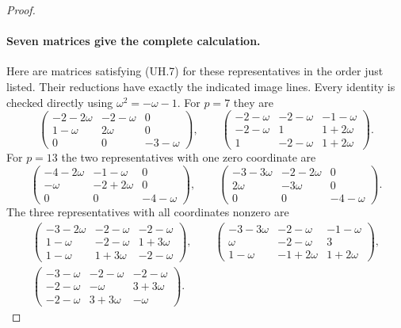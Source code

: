 \begin{proof}
\paragraph{Seven matrices give the complete calculation.}
Here are matrices satisfying (UH.7) for these representatives in the
order just listed.  Their reductions have exactly the indicated image
lines.  Every identity is checked directly using $\omega^2=-\omega-1$.
For $p=7$ they are
\[
 \begin{pmatrix}
 -2-2\omega&-2-\omega&0\\
 1-\omega&2\omega&0\\
 0&0&-3-\omega
 \end{pmatrix},\qquad
 \begin{pmatrix}
 -2-\omega&-2-\omega&-1-\omega\\
 -2-\omega&1&1+2\omega\\
 1&-2-\omega&1+2\omega
 \end{pmatrix}.
 \tag{UH.10}
\]
For $p=13$ the two representatives with one zero coordinate are
\[
 \begin{pmatrix}
 -4-2\omega&-1-\omega&0\\
 -\omega&-2+2\omega&0\\
 0&0&-4-\omega
 \end{pmatrix},\qquad
 \begin{pmatrix}
 -3-3\omega&-2-2\omega&0\\
 2\omega&-3\omega&0\\
 0&0&-4-\omega
 \end{pmatrix}.
 \tag{UH.11}
\]
The three representatives with all coordinates nonzero are
\begin{gather*}
 \begin{pmatrix}
 -3-2\omega&-2-\omega&-2-\omega\\
 1-\omega&-2-\omega&1+3\omega\\
 1-\omega&1+3\omega&-2-\omega
 \end{pmatrix},\qquad
 \begin{pmatrix}
 -3-3\omega&-2-\omega&-1-\omega\\
 \omega&-2-\omega&3\\
 1-\omega&-1+2\omega&1+2\omega
 \end{pmatrix},\\[3pt]
 \begin{pmatrix}
 -3-\omega&-2-\omega&-2-\omega\\
 -2-\omega&-\omega&3+3\omega\\
 -2-\omega&3+3\omega&-\omega
 \end{pmatrix}.

\end{gather*}
\end{proof}
